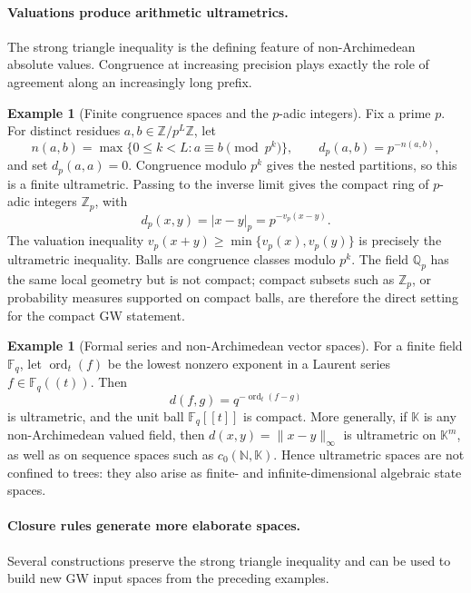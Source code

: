 \documentclass[11pt,a4paper]{article}
\theoremstyle{definition}
\newtheorem{example}[theorem]{Example}
\theoremstyle{remark}
\newcommand{\abs}[1]{\left\lvert #1\right\rvert}
\begin{document}
\paragraph{Valuations produce arithmetic ultrametrics.}
The strong triangle inequality is the defining feature of non-Archimedean
absolute values.  Congruence at increasing precision plays exactly the role
of agreement along an increasingly long prefix.

\begin{example}[Finite congruence spaces and the \(p\)-adic integers]
\label{ex:padic-ultrametric}
Fix a prime \(p\).  For distinct residues
\(a,b\in\mathbb Z/p^L\mathbb Z\), let
\[
  n(a,b)=\max\{0\leq k<L:a\equiv b\pmod {p^k}\},
  \qquad d_p(a,b)=p^{-n(a,b)},
\]
and set \(d_p(a,a)=0\).  Congruence modulo \(p^k\) gives the nested
partitions, so this is a finite ultrametric.  Passing to the inverse limit
gives the compact ring of \(p\)-adic integers \(\mathbb Z_p\), with
\begin{equation}
  d_p(x,y)=\abs{x-y}_p=p^{-v_p(x-y)}.
  \label{eq:padic-ultrametric}
\end{equation}
The valuation inequality
\(v_p(x+y)\geq\min\{v_p(x),v_p(y)\}\) is precisely the ultrametric
inequality.  Balls are congruence classes modulo \(p^k\).  The field
\(\mathbb Q_p\) has the same local geometry but is not compact; compact
subsets such as \(\mathbb Z_p\), or probability measures supported on compact
balls, are therefore the direct setting for the compact GW statement.
\end{example}

\begin{example}[Formal series and non-Archimedean vector spaces]
\label{ex:valued-field-ultrametric}
For a finite field \(\mathbb F_q\), let
\(\operatorname{ord}_t(f)\) be the lowest nonzero exponent in a Laurent
series \(f\in\mathbb F_q((t))\).  Then
\[
  d(f,g)=q^{-\operatorname{ord}_t(f-g)}
\]
is ultrametric, and the unit ball \(\mathbb F_q[[t]]\) is compact.  More
generally, if \(\mathbb K\) is any non-Archimedean valued field, then
\(d(x,y)=\lVert x-y\rVert_\infty\) is ultrametric on
\(\mathbb K^m\), as well as on sequence spaces such as
\(c_0(\mathbb N,\mathbb K)\).  Hence ultrametric spaces are not confined to
trees: they also arise as finite- and infinite-dimensional algebraic state
spaces.
\end{example}

\paragraph{Closure rules generate more elaborate spaces.}
Several constructions preserve the strong triangle inequality and can be
used to build new GW input spaces from the preceding examples.
\end{document}
